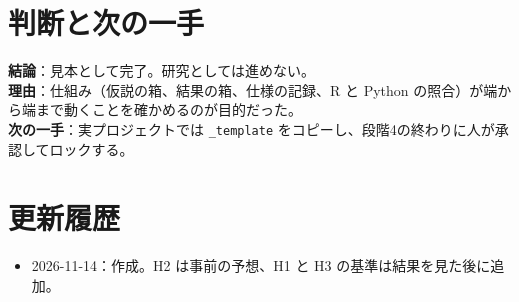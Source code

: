 \documentclass[a4paper,10pt]{ltjsarticle}
\begin{document}
\section{判断と次の一手}\label{sec:demo-decision}
\begin{decision}
\textbf{結論}：見本として完了。研究としては進めない。\\
\textbf{理由}：仕組み（仮説の箱、結果の箱、仕様の記録、R と Python の照合）が端から端まで動くことを確かめるのが目的だった。\\
\textbf{次の一手}：実プロジェクトでは \texttt{\_template} をコピーし、段階4の終わりに人が承認してロックする。
\end{decision}

\section*{更新履歴}
\begin{itemize}
  \item 2026-11-14：作成。H2 は事前の予想、H1 と H3 の基準は結果を見た後に追加。
\end{itemize}

\printbibliography[title={参考文献}]
\end{document}
